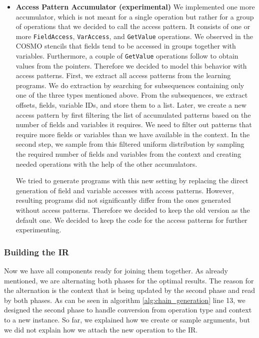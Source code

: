 \documentclass[sigplan,\review anonymous]{acmart}
\begin{document}
\begin{itemize}
  \item \textbf{Access Pattern Accumulator (experimental)} We implemented 
  one more accumulator, which is not meant for a single operation but rather
  for a group of operations that we decided to call the access pattern. It
  consists of one or more \texttt{FieldAccess}, \texttt{VarAccess}, and
  \texttt{GetValue} operations. We observed in the COSMO stencils that fields
  tend to be accessed in groups together with variables. Furthermore, a couple
  of \texttt{GetValue} operations follow to obtain values from the pointers.
  Therefore we decided to model this behavior with access patterns. First,
  we extract all access patterns from the learning programs. We do extraction
  by searching for subsequences containing only one of the three types
  mentioned above. From the subsequences, we extract offsets, fields, variable
  IDs, and store them to a list. Later, we create a new access pattern by first
  filtering the list of accumulated patterns based on the number of fields and
  variables it requires. We need to filter out patterns that require more
  fields or variables than we have available in the context. In the second
  step, we sample from this filtered uniform distribution by sampling the
  required number of fields and variables from the context and creating needed
  operations with the help of the other accumulators.

  We tried to generate programs with this new setting by replacing the direct
  generation of field and variable accesses with access patterns. However,
  resulting programs did not significantly differ from the ones generated
  without access patterns. Therefore we decided to keep the old version as
  the default one. We decided to keep the code for the access patterns for
  further experimenting.

\end{itemize}

\subsubsection{Building the IR}

Now we have all components ready for joining them together. As already
mentioned, we are alternating both phases for the optimal results. The reason
for the alternation is the context that is being updated by the second phase
and read by both phases. As can be seen in algorithm \ref{alg:chain_generation}
line 13, we designed the second phase to handle conversion from operation type
and context to a new instance. So far, we explained how we create or sample
arguments, but we did not explain how we attach the new operation to the IR.
\end{document}
